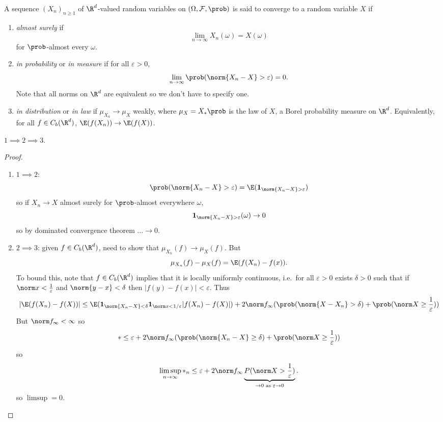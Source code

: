 \documentclass[a4paper]{article}
\renewcommand{\P}{\prob} %
\begin{document}
\begin{definition}
  A sequence \((X_n)_{n \geq 1}\) of \(\R^d\)-valued random variables on \((\Omega, \mathcal F, \P)\) is said to converge to a random variable \(X\) if
  \begin{enumerate}
  \item \emph{almost surely} if
    \[
      \lim_{n \to \infty} X_n(\omega) = X(\omega)
    \]
    for \(\P\)-almost every \(\omega\).
  \item \emph{in probability} or \emph{in measure} if for all \(\varepsilon > 0\),
    \[
      \lim_{n \to \infty} \P(\norm{X_n - X} > \varepsilon) = 0.
    \]
    Note that all norms on \(\R^d\) are equivalent so we don't have to specify one.
  \item \emph{in distribution} or \emph{in law} if \(\mu_{X_n} \to \mu_X\) weakly, where \(\mu_X = X_*\P\) is the law of \(X\), a Borel probability measure on \(\R^d\). Equivalently, for all \(f \in C_b(\R^d)\), \(\E(f(X_n)) \to \E(f(X))\).
  \end{enumerate}
\end{definition}

\begin{proposition}
  \(1 \implies 2 \implies 3\).
\end{proposition}

\begin{proof}\leavevmode
  \begin{enumerate}
  \item \(1 \implies 2\):
    \[
      \P(\norm{X_n - X} > \varepsilon) = \E(\mathbf 1_{\norm{X_n - X} > \varepsilon})
    \]
    so if \(X_n \to X\) almost surely for \(\P\)-almost everywhere \(\omega\),
    \[
      \mathbf 1_{\norm{X_n - X} > \varepsilon} (\omega) \to 0
    \]
    so by dominated convergence theorem \(\dots \to 0\).
  \item \(2 \implies 3\): given \(f \in C_b(\R^d)\), need to show that \(\mu_{X_n}(f) \to \mu_X(f)\). But
    \[
      \mu_{X_n}(f) - \mu_X(f) = \E(f(X_n) - f(x)).
    \]
    To bound this, note that \(f \in C_b(\R^d)\) implies that it is locally uniformly continuous, i.e.\ for all \(\varepsilon > 0\) exists \(\delta > 0\) such that if \(\norm x < \frac{1}{\varepsilon}\) and \(\norm{y - x} < \delta\) then \(|f(y) - f(x)| < \varepsilon\). Thus
    \[
      |\E(f(X_n)  - f(X))|
      \leq \E(\mathbf 1_{\norm{X_n - X} < \delta} \mathbf 1_{\norm x < 1/\varepsilon} |f(X_n) - f(X)|)
      + 2 \norm f_\infty (\P(\norm{X - X_n} > \delta) + \P(\norm X \geq \frac{1}{\varepsilon}))
    \]
    But \(\norm f_\infty < \infty\) so
    \[
      * \leq \varepsilon + 2 \norm f_\infty (\P(\norm{X_n - X} \geq \delta) + \P(\norm X \geq \frac{1}{\varepsilon}))
    \]
    so
    \[
      \limsup_{n \to \infty} *_n \leq \varepsilon + 2 \norm f_\infty \underbrace{P(\norm X > \frac{1}{\varepsilon})}_{\to 0 \text{ as } \varepsilon \to 0}.
    \]
    so \(\limsup = 0\).
  \end{enumerate}
\end{proof}
\end{document}
